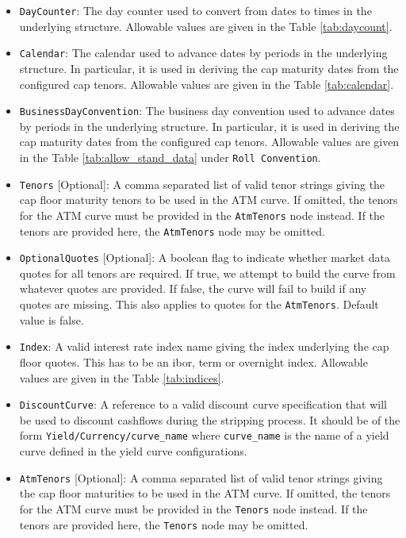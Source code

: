 \begin{itemize}
\item \lstinline!DayCounter!:
The day counter used to convert from dates to times in the underlying structure. Allowable values are given in the Table \ref{tab:daycount}.

\item \lstinline!Calendar!:
The calendar used to advance dates by periods in the underlying structure. In particular, it is used in deriving the cap maturity dates from the configured cap tenors. Allowable values are given in the Table \ref{tab:calendar}.

\item \lstinline!BusinessDayConvention!:
The business day convention used to advance dates by periods in the underlying structure. In particular, it is used in deriving the cap maturity dates from the configured cap tenors. Allowable values are given in the Table \ref{tab:allow_stand_data} under \lstinline!Roll Convention!.

\item \lstinline!Tenors! [Optional]:
A comma separated list of valid tenor strings giving the cap floor maturity tenors to be used in the ATM curve. If omitted, the tenors for the ATM curve must be provided in the \lstinline!AtmTenors! node instead. If the tenors are provided here, the \lstinline!AtmTenors! node may be omitted.

\item \lstinline!OptionalQuotes! [Optional]:
A boolean flag to indicate whether market data quotes for all tenors are required. If true, we attempt to build the curve from whatever quotes are provided. If false, the curve will fail to build if any quotes are missing. This also applies to quotes for the \lstinline!AtmTenors!. Default value is false.

\item \lstinline!Index!:
A valid interest rate index name giving the index underlying the cap floor quotes. This has to be an ibor, term or overnight index. Allowable values are given in the Table \ref{tab:indices}.

\item \lstinline!DiscountCurve!:
A reference to a valid discount curve specification that will be used to discount cashflows during the stripping process. It should be of the form \lstinline!Yield/Currency/curve_name! where \lstinline!curve_name! is the name of a yield curve defined in the yield curve configurations.

\item \lstinline!AtmTenors! [Optional]:
A comma separated list of valid tenor strings giving the cap floor maturities to be used in the ATM curve. If omitted, the tenors for the ATM curve must be provided in the \lstinline!Tenors! node instead. If the tenors are provided here, the \lstinline!Tenors! node may be omitted.


\end{itemize}
